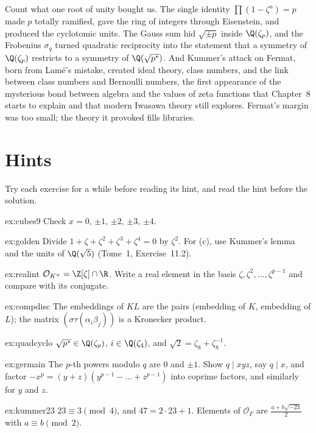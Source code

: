 \begin{beauty}
Count what one root of unity bought us. The single identity $\prod(1-\zeta^a)=p$ made $p$ totally ramified, gave the ring of
integers through Eisenstein, and produced the cyclotomic units. The Gauss sum hid $\sqrt{\pm p}$ inside $\Q(\zeta_p)$, and
the Frobenius $\sigma_q$ turned quadratic reciprocity into the statement that a symmetry of $\Q(\zeta_p)$ restricts to a
symmetry of $\Q(\sqrt{p^*})$. And Kummer's attack on Fermat, born from Lamé's mistake, created ideal theory, class
numbers, and the link between class numbers and Bernoulli numbers, the first appearance of the mysterious bond between
algebra and the values of zeta functions that Chapter~8 starts to explain and that modern Iwasawa theory still explores.
Fermat's margin was too small; the theory it provoked fills libraries.
\end{beauty}

\section{Hints}

Try each exercise for a while before reading its hint, and read the hint before the solution.

\begin{hint}{ex:cubes9}
Check $x=0$, $\pm1$, $\pm2$, $\pm3$, $\pm4$.
\end{hint}
\begin{hint}{ex:golden}
Divide $1+\zeta+\zeta^2+\zeta^3+\zeta^4=0$ by $\zeta^2$. For (c), use Kummer's lemma and the units of $\Q(\sqrt5)$ (Tome~1,
Exercise~11.2).
\end{hint}
\begin{hint}{ex:realint}
$\mathcal O_{K^+}=\Z[\zeta]\cap\R$. Write a real element in the basis $\zeta,\zeta^2,\dots,\zeta^{p-1}$ and compare with its
conjugate.
\end{hint}
\begin{hint}{ex:compdisc}
The embeddings of $KL$ are the pairs (embedding of $K$, embedding of $L$); the matrix $(\sigma\tau(\alpha_i\beta_j))$ is a
Kronecker product.
\end{hint}
\begin{hint}{ex:quadcyclo}
$\sqrt{p^*}\in\Q(\zeta_p)$, $i\in\Q(\zeta_4)$, and $\sqrt2=\zeta_8+\zeta_8^{-1}$.
\end{hint}
\begin{hint}{ex:germain}
The $p$-th powers modulo $q$ are $0$ and $\pm1$. Show $q\mid xyz$, say $q\mid x$, and factor $-x^p=(y+z)(y^{p-1}-\dots+z^{p-1})$
into coprime factors, and similarly for $y$ and $z$.
\end{hint}
\begin{hint}{ex:kummer23}
$23\equiv3\pmod4$, and $47=2\cdot23+1$. Elements of $\mathcal O_F$ are $\frac{a+b\sqrt{-23}}2$ with $a\equiv b\pmod2$.
\end{hint}

